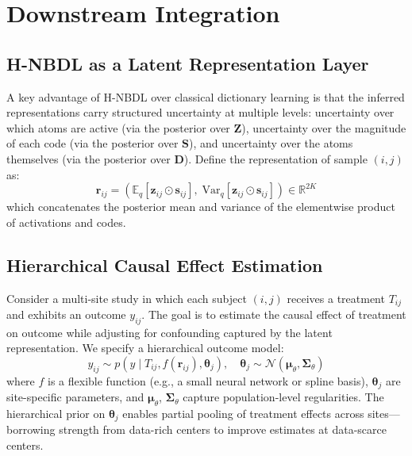 \documentclass[11pt,a4paper]{article}
\theoremstyle{definition}
\begin{document}
\section{Downstream Integration}\label{sec:downstream}

\subsection{H-NBDL as a Latent Representation Layer}

A key advantage of H-NBDL over classical dictionary learning is that the inferred representations carry structured uncertainty at multiple levels: uncertainty over which atoms are active (via the posterior over $\mathbf{Z}$), uncertainty over the magnitude of each code (via the posterior over $\mathbf{S}$), and uncertainty over the atoms themselves (via the posterior over $\mathbf{D}$). Define the representation of sample $(i,j)$ as:
\begin{equation}
  \mathbf{r}_{ij} = \left(\mathbb{E}_q[\mathbf{z}_{ij} \odot \mathbf{s}_{ij}],\; \mathrm{Var}_q[\mathbf{z}_{ij} \odot \mathbf{s}_{ij}]\right) \in \mathbb{R}^{2K} \label{eq:repr}
\end{equation}
which concatenates the posterior mean and variance of the elementwise product of activations and codes.

\subsection{Hierarchical Causal Effect Estimation}\label{sec:causal}

Consider a multi-site study in which each subject $(i,j)$ receives a treatment $T_{ij}$ and exhibits an outcome $y_{ij}$. The goal is to estimate the causal effect of treatment on outcome while adjusting for confounding captured by the latent representation. We specify a hierarchical outcome model:
\begin{equation}
  y_{ij} \sim p(y \mid T_{ij}, f(\mathbf{r}_{ij}), \boldsymbol{\theta}_j), \quad \boldsymbol{\theta}_j \sim \mathcal{N}(\boldsymbol{\mu}_\theta, \boldsymbol{\Sigma}_\theta) \label{eq:causal}
\end{equation}
where $f$ is a flexible function (e.g., a small neural network or spline basis), $\boldsymbol{\theta}_j$ are site-specific parameters, and $\boldsymbol{\mu}_\theta$, $\boldsymbol{\Sigma}_\theta$ capture population-level regularities. The hierarchical prior on $\boldsymbol{\theta}_j$ enables partial pooling of treatment effects across sites---borrowing strength from data-rich centers to improve estimates at data-scarce centers.
\end{document}
